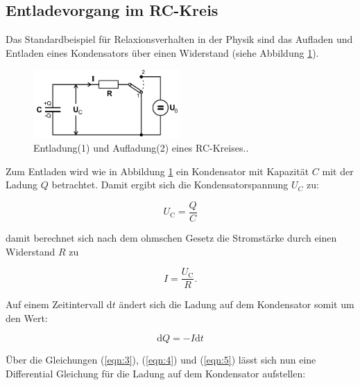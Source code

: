     \subsection{Entladevorgang im RC-Kreis}

        \noindent Das Standardbeispiel für Relaxionsverhalten in der Physik sind das Aufladen und Entladen eines Kondensators über einen 
        Widerstand (siehe Abbildung \ref{img:A_und_e}).

        \begin{figure}
            \centering
            \includegraphics[width=0.5\textwidth]{latex/images/Auflade_und_entlade.PNG}
            \caption{Entladung(1) und Aufladung(2) eines RC-Kreises.\protect \cite{V353}.}
            \label{img:A_und_e}
        \end{figure}

        \noindent Zum Entladen wird wie in Abbildung \ref{img:A_und_e} ein Kondensator mit Kapazität $C$ mit der Ladung $Q$ betrachtet.
        Damit ergibt sich die Kondensatorspannung $U_C$ zu:

        \begin{equation}
            U_{\text{C}} = \frac{Q}{C}
            \label{eqn:3}
        \end{equation}

        \noindent damit berechnet sich nach dem ohmschen Gesetz die Stromstärke durch einen Widerstand $R$ zu

        \begin{equation}
            I = \frac{U_{\text{C}}}{R} .
            \label{eqn:4}
        \end{equation}

        \noindent Auf einem Zeitintervall d$t$ ändert sich die Ladung auf dem Kondensator somit um den Wert:

        \begin{equation}
            \text{d}Q = -I \text{d}t
            \label{eqn:5}
        \end{equation}

        \noindent Über die Gleichungen (\ref{eqn:3}), (\ref{eqn:4}) und (\ref{eqn:5}) lässt sich nun eine Differential Gleichung für die 
        Ladung auf dem Kondensator aufstellen:

